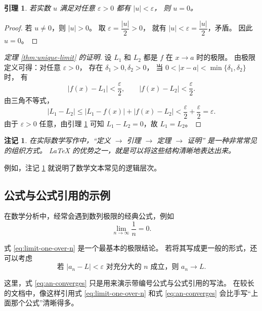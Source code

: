 \documentclass[UTF8]{ctexart}
\newtheorem{lemma}[theorem]{引理}
\newtheorem{remark}{注记}[section]
\numberwithin{equation}{section}
\begin{document}
\begin{lemma}\label{lem:abs-zero}
若实数 $u$ 满足对任意 $\varepsilon>0$ 都有 $|u|<\varepsilon$，
则 $u=0$。
\end{lemma}

\begin{proof}
若 $u\neq 0$，则 $|u|>0$。
取 $\varepsilon=\dfrac{|u|}{2}>0$，
就有 $|u|<\varepsilon=\dfrac{|u|}{2}$，矛盾。
因此 $u=0$。
\end{proof}

\begin{proof}[定理 \ref{thm:unique-limit} 的证明]
设 $L_1$ 和 $L_2$ 都是 $f$ 在 $x\to a$ 时的极限。
由极限定义可得：对任意 $\varepsilon>0$，
存在 $\delta_1>0,\delta_2>0$，
当 $0<|x-a|<\min\{\delta_1,\delta_2\}$ 时，
有
\[
|f(x)-L_1|<\frac{\varepsilon}{2},
\qquad
|f(x)-L_2|<\frac{\varepsilon}{2}.
\]
由三角不等式，
\[
|L_1-L_2|
\le |L_1-f(x)|+|f(x)-L_2|
< \frac{\varepsilon}{2}+\frac{\varepsilon}{2}
= \varepsilon.
\]
由于 $\varepsilon>0$ 任意，由引理 \ref{lem:abs-zero} 可知
$L_1-L_2=0$，故 $L_1=L_2$。
\end{proof}

\begin{remark}\label{rem:structure}
在实际数学写作中，“定义 $\to$ 引理 $\to$ 定理 $\to$ 证明”
是一种非常常见的组织方式。
LaTeX 的优势之一，就是可以将这些结构清晰地表达出来。
\end{remark}

例如，注记 \ref{rem:structure} 就说明了数学文本常见的逻辑层次。

\subsection{公式与公式引用的示例}

在数学分析中，经常会遇到数列极限的经典公式，例如
\begin{equation}\label{eq:limit-one-over-n}
\lim_{n\to\infty}\frac{1}{n}=0.
\end{equation}

式 \eqref{eq:limit-one-over-n} 是一个最基本的极限结论。
若将其写成更一般的形式，还可以考虑
\begin{equation}\label{eq:an-converges}
\text{若 } |a_n-L|<\varepsilon \text{ 对充分大的 } n \text{ 成立，则 } a_n\to L.
\end{equation}

这里，式 \eqref{eq:an-converges} 只是用来演示带编号公式与公式引用的写法。
在较长的文档中，像这样引用式 \eqref{eq:limit-one-over-n} 和式 \eqref{eq:an-converges}
会比手写“上面那个公式”清晰得多。
\end{document}
